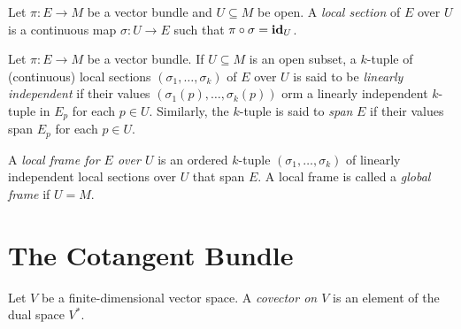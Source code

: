 \begin{definition}
    Let $\pi: E\to M$ be a vector bundle and $U\subseteq M$ be open. A \emph{local section} of $E$ over $U$ is a continuous map $\sigma: U\to E$ such that $\pi\circ\sigma = \mathbf{id}_U$.
\end{definition}

\begin{definition}
    Let $\pi: E\to M$ be a vector bundle. If $U\subseteq M$ is an open subset, a $k$-tuple of (continuous) local sections $(\sigma_1,\dots,\sigma_k)$ of $E$ over $U$ is said to be \emph{linearly independent} if their values $(\sigma_1(p),\dots,\sigma_k(p))$ orm a linearly independent $k$-tuple in $E_p$ for each $p\in U$. Similarly, the $k$-tuple is said to \emph{span} $E$ if their values span $E_p$ for each $p\in U$.

    A \emph{local frame for $E$ over $U$} is an ordered $k$-tuple $(\sigma_1,\dots,\sigma_k)$ of linearly independent local sections over $U$ that span $E$. A local frame is called a \emph{global frame} if $U = M$.
\end{definition}

\section{The Cotangent Bundle}

\begin{definition}
    Let $V$ be a finite-dimensional vector space. A \emph{covector on $V$} is an element of the dual space $V^*$.
\end{definition}